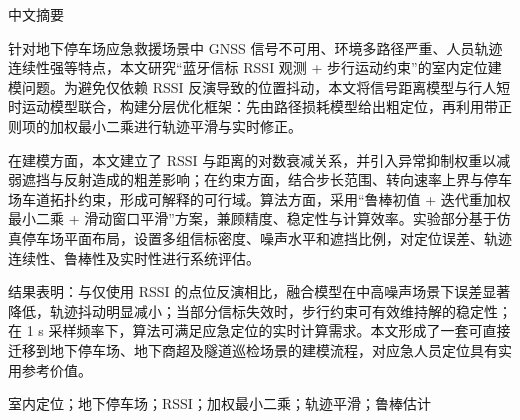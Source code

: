 \thispagestyle{plain}
{}
\centerline{\heiti 中文摘要}

\linespread{1.4}\bigskip

针对地下停车场应急救援场景中 GNSS 信号不可用、环境多路径严重、人员轨迹连续性强等特点，本文研究“蓝牙信标 RSSI 观测 + 步行运动约束”的室内定位建模问题。为避免仅依赖 RSSI 反演导致的位置抖动，本文将信号距离模型与行人短时运动模型联合，构建分层优化框架：先由路径损耗模型给出粗定位，再利用带正则项的加权最小二乘进行轨迹平滑与实时修正。

在建模方面，本文建立了 RSSI 与距离的对数衰减关系，并引入异常抑制权重以减弱遮挡与反射造成的粗差影响；在约束方面，结合步长范围、转向速率上界与停车场车道拓扑约束，形成可解释的可行域。算法方面，采用“鲁棒初值 + 迭代重加权最小二乘 + 滑动窗口平滑”方案，兼顾精度、稳定性与计算效率。实验部分基于仿真停车场平面布局，设置多组信标密度、噪声水平和遮挡比例，对定位误差、轨迹连续性、鲁棒性及实时性进行系统评估。

结果表明：与仅使用 RSSI 的点位反演相比，融合模型在中高噪声场景下误差显著降低，轨迹抖动明显减小；当部分信标失效时，步行约束可有效维持解的稳定性；在 1 s 采样频率下，算法可满足应急定位的实时计算需求。本文形成了一套可直接迁移到地下停车场、地下商超及隧道巡检场景的建模流程，对应急人员定位具有实用参考价值。

\bigskip
{}
室内定位；地下停车场；RSSI；加权最小二乘；轨迹平滑；鲁棒估计
